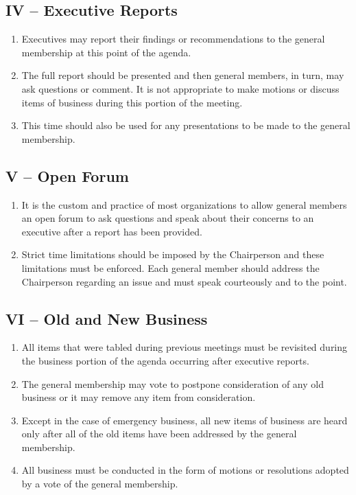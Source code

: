 \documentclass[12pt,a4paper]{article}
\begin{document}
\subsection*{IV – Executive Reports}

\begin{enumerate}
\item Executives may report their findings or recommendations to the general membership at this point of the agenda.

\item The full report should be presented and then general members, in turn, may ask questions or comment. It is not appropriate to make motions or discuss items of business during this portion of the meeting.

\item This time should also be used for any presentations to be made to the general membership.
\end{enumerate}

\subsection*{V – Open Forum}

\begin{enumerate}
\item It is the custom and practice of most organizations to allow general members an open forum to ask questions and speak about their concerns to an executive after a report has been provided.

\item Strict time limitations should be imposed by the Chairperson and these limitations must be enforced. Each general member should address the Chairperson regarding an issue and must speak courteously and to the point.
\end{enumerate}

\subsection*{VI – Old and New Business}

\begin{enumerate}
\item All items that were tabled during previous meetings must be revisited during the business portion of the agenda occurring after executive reports.

\item The general membership may vote to postpone consideration of any old business or it may remove any item from consideration.

\item Except in the case of emergency business, all new items of business are heard only after all of the old items have been addressed by the general membership.

\item All business must be conducted in the form of motions or resolutions adopted by a vote of the general membership.
\end{enumerate}
\end{document}
